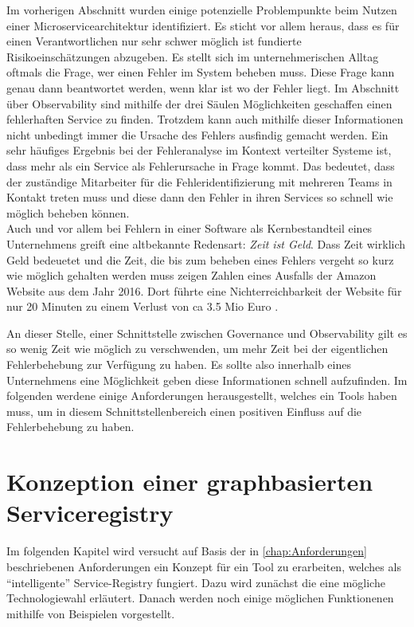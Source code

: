 \documentclass[
	12pt,
	BCOR=5mm,
	DIV=12,
	headinclude=on,
	footinclude=off,
	parskip=half,
	bibliography=totoc,
	listof=entryprefix,
	toc=listof,
	numbers=noenddot,
	plainfootsepline
]{scrreprt}
\begin{document}
Im vorherigen Abschnitt wurden einige potenzielle Problempunkte beim Nutzen einer Microservicearchitektur identifiziert. Es sticht vor allem heraus, dass es für einen Verantwortlichen nur sehr schwer möglich ist fundierte Risikoeinschätzungen abzugeben. Es stellt sich im unternehmerischen Alltag oftmals die Frage, wer einen Fehler im System beheben muss. Diese Frage kann genau dann beantwortet werden, wenn klar ist wo der Fehler liegt. Im Abschnitt über Observability sind mithilfe der drei Säulen Möglichkeiten geschaffen einen fehlerhaften Service zu finden. Trotzdem kann auch mithilfe dieser Informationen nicht unbedingt immer die Ursache des Fehlers ausfindig gemacht werden. Ein sehr häufiges Ergebnis bei der Fehleranalyse im Kontext verteilter Systeme ist, dass mehr als ein Service als Fehlerursache in Frage kommt. Das bedeutet, dass der zuständige Mitarbeiter für die Fehleridentifizierung mit mehreren Teams in Kontakt treten muss und diese dann den Fehler in ihren Services so schnell wie möglich beheben können. \\
Auch und vor allem bei Fehlern in einer Software als Kernbestandteil eines Unternehmens greift eine altbekannte Redensart: \textit{Zeit ist Geld}. Dass Zeit wirklich Geld bedeuetet und die Zeit, die bis zum beheben eines Fehlers vergeht so kurz wie möglich gehalten werden muss zeigen Zahlen eines Ausfalls der Amazon Website aus dem Jahr 2016. Dort führte eine Nichterreichbarkeit der Website für nur 20 Minuten zu einem Verlust von ca 3.5 Mio Euro .

An dieser Stelle, einer Schnittstelle zwischen Governance und Observability gilt es so wenig Zeit wie möglich zu verschwenden, um mehr Zeit bei der eigentlichen Fehlerbehebung zur Verfügung zu haben. Es sollte also innerhalb eines Unternehmens eine Möglichkeit geben diese Informationen schnell aufzufinden. Im folgenden werdene einige Anforderungen herausgestellt, welches ein Tools haben muss, um in diesem Schnittstellenbereich einen positiven Einfluss auf die Fehlerbehebung zu haben.

\chapter{Konzeption einer graphbasierten Serviceregistry}

Im folgenden Kapitel wird versucht auf Basis der in \vref{chap:Anforderungen} beschriebenen Anforderungen ein Konzept für ein Tool zu erarbeiten, welches als \enquote{intelligente} Service-Registry fungiert. Dazu wird zunächst die eine mögliche Technologiewahl erläutert. Danach werden noch einige möglichen Funktionenen mithilfe von Beispielen vorgestellt.
\end{document}
